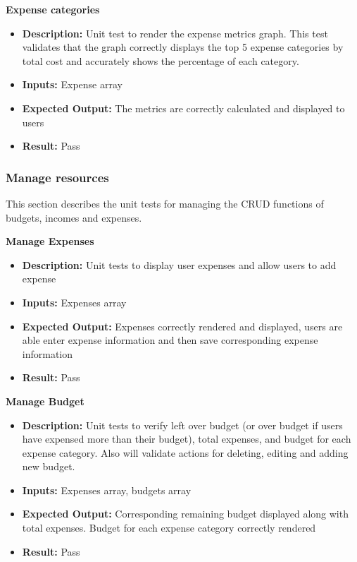 \documentclass[12pt, titlepage]{article}
\begin{document}
\textbf{Expense categories}

\begin{itemize}
  \item \textbf{Description:} Unit test to render the expense metrics graph. This test validates that the graph correctly displays the top 5 expense categories by 
  total cost and accurately shows the percentage of each category.
  \item \textbf{Inputs:} Expense array
  \item \textbf{Expected Output:} The metrics are correctly calculated and displayed to users
  \item \textbf{Result:} Pass
\end{itemize}

\subsubsection{Manage resources}

This section describes the unit tests for managing the CRUD functions of budgets, incomes and expenses.

\vspace{10pt}
\textbf{Manage Expenses}

\begin{itemize}
  \item \textbf{Description:} Unit tests to display user expenses and allow users to add expense
  \item \textbf{Inputs:} Expenses array
  \item \textbf{Expected Output:} Expenses correctly rendered and displayed, users are able enter expense information and then save corresponding expense information
  \item \textbf{Result:} Pass
\end{itemize}

\textbf{Manage Budget}

\begin{itemize}
  \item \textbf{Description:} Unit tests to verify left over budget (or over budget if users have expensed more than their budget), total expenses, and budget for each expense category.
  Also will validate actions for deleting, editing and adding new budget.
  \item \textbf{Inputs:} Expenses array, budgets array
  \item \textbf{Expected Output:} Corresponding remaining budget displayed along with total expenses. Budget for each expense category correctly rendered
  \item \textbf{Result:} Pass
\end{itemize}
\end{document}
